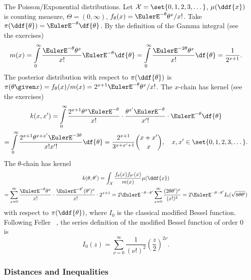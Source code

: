 \documentclass[12pt]{article}
\begin{document}
\begin{example}
    The Poisson/Exponential distributions.  Let \( \mathcal{X} = \set{0,1,2,3,
    \dots} \), \( \mu(\ddf{x}) \) is counting measure, \( \Theta = (0,\infty)
    \), \( f_{\theta}(x) = \EulerE^{-\theta}\theta^x/x! \).  Take \( \pi
    (\ddf{\theta}) = \EulerE^{-\theta} \df{\theta} \).  By the
    definition of the Gamma integral (see the exercises)
    \[
        m(x) = \int\limits_0^{\infty} \frac{\EulerE^{-\theta} \theta^x}{x!}
        \EulerE^{-\theta} \df{\theta} = \int\limits_0^{\infty} \frac{\EulerE^
        {-2\theta} \theta^x}{x!} \df{\theta} = \frac{1}{2^{x+1}}.
    \] The posterior distribution with respect to \( \pi(\ddf{\theta}) \)
    is \( \pi(\theta \given x) = f_{\theta}(x)/m(x) = 2^{x+1} \EulerE^{-\theta}\theta^x/x!
    \).  The \( x \)-chain has kernel (see the exercises)
    \begin{multline*}
        k(x,x') = \int\limits_0^{\infty}\frac{2^{x+1} \theta^x \EulerE^{-\theta}}
        {x!} \cdot \frac{\theta^{x'} \EulerE^{-\theta}}{x'!} \cdot
        \EulerE^{-\theta} \df{\theta} \\
        = \int\limits_0^{\infty}\frac{2^{x+1} \theta^{x+x'} \EulerE^{-3\theta}}
        {x!x'!} \df{\theta} = \frac{2^{x+1}}{3^{x+x'+1}} \binom{x+x'}{x},
        \quad x,x' \in \set{0,1,2,3, \dots}.
    \end{multline*}
    The \( \theta \)-chain has kernel
    \begin{multline*}
        k(\theta,\theta') = \int_{\mathcal{X}} \frac{f_{\theta}(x) f_{\theta'}
        (x)}{m(x)}\mu(\ddf{x}) \\
        = \sum_{x=0}^{\infty} \frac{\EulerE^{-\theta} \theta^x}{x!}
        \cdot \frac{\EulerE^{-\theta'} (\theta')^x}{x!} \cdot 2^{x+1} =
        2 \EulerE^{-\theta-\theta'} \sum\limits_{x=0}^ {\infty} \frac {(2\theta
        \theta')^x}{(x!)^2} = 2 \EulerE^{-\theta-\theta'}I_0(\sqrt{8
        \theta \theta'})
    \end{multline*}
    with respect to \( \pi(\ddf{\theta}) \), where \( I_0 \) is the
    classical modified Bessel function.  Following Feller~%
    \cite[Section 2.7, pages 58--61]{feller71}, the series definition of
    the modified Bessel function of order \( 0 \) is
    \[
        I_0(z) = \sum\limits_{\nu=0}^{\infty} \frac{1}{(\nu !)^2}\left(
        \frac {z}{2} \right)^{2\nu}.
    \]
\end{example}

\subsubsection*{Distances and Inequalities}
\end{document}
